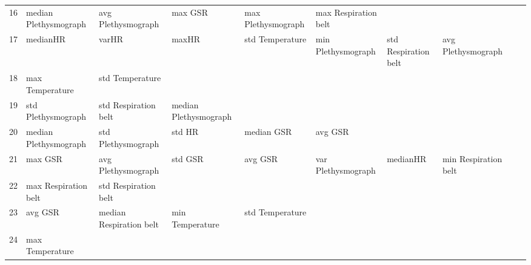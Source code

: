 \begin{landscape}
\begin{table}[]
\begin{tabular}{l|llllllll}
16       & median Plethysmograph   & avg Plethysmograph      & max GSR                 & max Plethysmograph      & max Respiration belt    &                       &                         &                         &                         &         \\
17       & medianHR                & varHR                   & maxHR                   & std Temperature         & min Plethysmograph      & std Respiration belt  & avg Plethysmograph      &                         &                         &         \\
18       & max Temperature         & std Temperature         &                         &                         &                         &                       &                         &                         &                         &         \\
19       & std Plethysmograph      & std Respiration belt    & median Plethysmograph   &                         &                         &                       &                         &                         &                         &         \\
20       & median Plethysmograph   & std Plethysmograph      & std HR                  & median GSR              & avg GSR                 &                       &                         &                         &                         &         \\
21       & max GSR                 & avg Plethysmograph      & std GSR                 & avg GSR                 & var Plethysmograph      & medianHR              & min Respiration belt    &                         &                         &         \\
22       & max Respiration belt    & std Respiration belt    &                         &                         &                         &                       &                         &                         &                         &         \\
23       & avg GSR                 & median Respiration belt & min Temperature         & std Temperature         &                         &                       &                         &                         &                         &         \\
24       & max Temperature         &                         &                         &                         &                         &                       &                         &                         &                         &         \\

\end{tabular}
\end{table}
\end{landscape}
